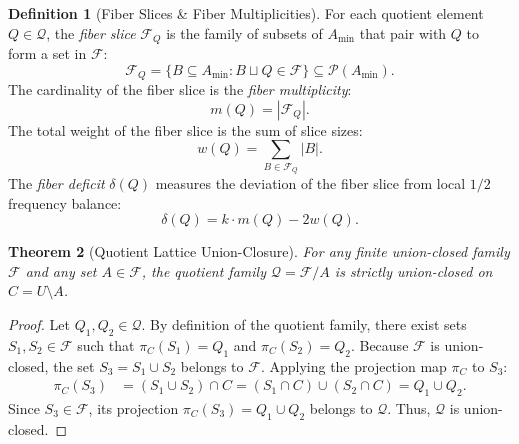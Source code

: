 \documentclass[11pt,a4paper]{article}
\theoremstyle{plain}
\newtheorem{theorem}{Theorem}[section]
\theoremstyle{definition}
\newtheorem{definition}[theorem]{Definition}
\theoremstyle{remark}
\newcommand{\F}{\mathcal{F}}
\newcommand{\Q}{\mathcal{Q}}
\begin{document}
\begin{definition}[Fiber Slices \& Fiber Multiplicities]
For each quotient element $Q \in \Q$, the \emph{fiber slice} $\F_Q$ is the family of subsets of $A_{\min}$ that pair with $Q$ to form a set in $\F$:
\begin{equation}
\F_Q = \{B \subseteq A_{\min} : B \sqcup Q \in \F\} \subseteq \mathcal{P}(A_{\min}).
\end{equation}
The cardinality of the fiber slice is the \emph{fiber multiplicity}:
\begin{equation}
m(Q) = |\F_Q|.
\end{equation}
The total weight of the fiber slice is the sum of slice sizes:
\begin{equation}
w(Q) = \sum_{B \in \F_Q} |B|.
\end{equation}
The \emph{fiber deficit} $\delta(Q)$ measures the deviation of the fiber slice from local $1/2$ frequency balance:
\begin{equation}
\delta(Q) = k \cdot m(Q) - 2 w(Q).
\end{equation}
\end{definition}

\begin{theorem}[Quotient Lattice Union-Closure]\label{thm:quotient_uc}
For any finite union-closed family $\F$ and any set $A \in \F$, the quotient family $\Q = \F / A$ is strictly union-closed on $C = U \setminus A$.
\end{theorem}
\begin{proof}
Let $Q_1, Q_2 \in \Q$. By definition of the quotient family, there exist sets $S_1, S_2 \in \F$ such that $\pi_C(S_1) = Q_1$ and $\pi_C(S_2) = Q_2$. Because $\F$ is union-closed, the set $S_3 = S_1 \cup S_2$ belongs to $\F$. Applying the projection map $\pi_C$ to $S_3$:
\begin{align}
\pi_C(S_3) &= (S_1 \cup S_2) \cap C = (S_1 \cap C) \cup (S_2 \cap C) = Q_1 \cup Q_2.
\end{align}
Since $S_3 \in \F$, its projection $\pi_C(S_3) = Q_1 \cup Q_2$ belongs to $\Q$. Thus, $\Q$ is union-closed.
\end{proof}
\end{document}

